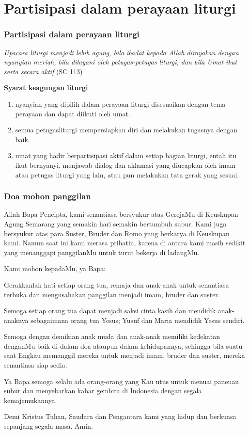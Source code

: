 \documentclass[aspectratio=169]{beamer}
\begin{document}
\section{Partisipasi dalam perayaan liturgi}
\begin{frame}[fragile]
\frametitle{Partisipasi dalam perayaan liturgi}
\textit{Upacara liturgi menjadi lebih agung, bila ibadat kepada Allah dirayakan dengan nyanyian meriah, bila dilayani oleh petugas-petugas liturgi, dan bila Umat ikut serta secara aktif} (SC 113)

\textbf{Syarat keagungan liturgi}
\begin{enumerate}[<+->]
	\item nyanyian yang dipilih dalam perayaan liturgi disesuaikan dengan tema perayaan dan dapat diikuti oleh umat. 
    \item semua petugasliturgi mempersiapkan diri dan melakukan tugasnya dengan baik. 
    \item umat yang hadir berpartisipasi aktif dalam setiap bagian liturgi, entah itu ikut bernyanyi, menjawab dialog dan aklamasi yang diucapkan oleh imam atau petugas liturgi yang lain, atau pun melakukan tata gerak yang sesuai.
\end{enumerate}
\end{frame}

\begin{frame}[fragile]
\frametitle{Doa mohon panggilan}
\small 
Allah Bapa Pencipta, kami senantiasa bersyukur atas GerejaMu di Keuskupan Agung Semarang yang semakin hari semakin bertumbuh subur.
Kami juga bersyukur atas para Suster, Bruder dan Romo yang berkarya di Keuskupan kami.
Namun saat ini kami merasa prihatin, karena di antara kami masih sedikit yang menanggapi panggilanMu untuk turut bekerja di ladangMu.

Kami mohon kepadaMu, ya Bapa:

Gerakkanlah hati setiap orang tua, remaja dan anak-anak untuk senantiasa terbuka dan mengusahakan panggilan menjadi imam, bruder dan suster.

Semoga setiap orang tua dapat menjadi saksi cinta kasih dan mendidik anak-anaknya sebagaimana orang tua Yesus; Yusuf dan Maria mendidik Yesus sendiri.

Semoga dengan demikian anak muda dan anak-anak memiliki kedekatan denganMu baik di dalam doa ataupun dalam kehidupannya, sehingga bila suatu saat Engkau memanggil mereka untuk menjadi imam, bruder dan suster, mereka senantiasa siap sedia.

Ya Bapa semoga selalu ada orang-orang yang Kau utus untuk menuai panenan subur dan menyebarkan kabar gembira di Indonesia dengan segala kemajemukannya.

Demi Kristus Tuhan, Saudara dan Pengantara kami yang hidup dan berkuasa sepanjang segala masa.
Amin.
\end{frame}
\end{document}

